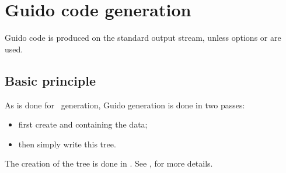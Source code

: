 
\chapter{Guido code generation}


Guido code is produced on the standard output stream, unless options  or  are used.


\section{Basic principle}

As is done for \mxml\ generation, Guido generation is done in two passes:
\begin{itemize}
\item first create and  containing the data;
\item then simply write this tree.
\end{itemize}

The creation of the tree is done in .
See , for more details.
